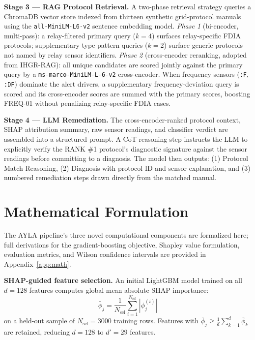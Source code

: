 \documentclass[twocolumn, 10pt, letterpaper]{article}
\begin{document}
\medskip
\noindent
\textbf{Stage 3 --- RAG Protocol Retrieval.}
A two-phase retrieval strategy queries a ChromaDB vector store indexed from
thirteen synthetic grid-protocol manuals using the \texttt{all-MiniLM-L6-v2}
sentence embedding model.
\textit{Phase 1} (bi-encoder, multi-pass): a relay-filtered primary query ($k{=}4$)
surfaces relay-specific FDIA protocols; supplementary type-pattern queries ($k{=}2$)
surface generic protocols not named by relay sensor identifiers.
\textit{Phase 2} (cross-encoder reranking, adopted from IHGR-RAG): all unique
candidates are scored jointly against the primary query by a
\texttt{ms-marco-MiniLM-L-6-v2} cross-encoder.
When frequency sensors (\texttt{:F}, \texttt{:DF}) dominate the alert drivers,
a supplementary frequency-deviation query is scored and its cross-encoder scores
are summed with the primary scores, boosting FREQ-01 without penalizing
relay-specific FDIA cases.

\medskip
\noindent
\textbf{Stage 4 --- LLM Remediation.}
The cross-encoder-ranked protocol context, SHAP attribution summary, raw sensor
readings, and classifier verdict are assembled into a structured prompt.
A CoT reasoning step instructs the LLM to explicitly verify the RANK \#1 protocol's
diagnostic signature against the sensor readings before committing to a diagnosis.
The model then outputs: (1) Protocol Match Reasoning,
(2) Diagnosis with protocol ID and sensor explanation, and (3) numbered remediation
steps drawn directly from the matched manual.

\section{Mathematical Formulation}
\label{sec:math}

The AYLA pipeline's three novel computational components are formalized here;
full derivations for the gradient-boosting objective, Shapley value formulation,
evaluation metrics, and Wilson confidence intervals are provided in
Appendix~\ref{app:math}.

\textbf{SHAP-guided feature selection.}
An initial LightGBM model trained on all $d{=}128$ features computes global mean
absolute SHAP importance:
\begin{equation}
    \bar{\phi}_j = \frac{1}{N_{\text{sel}}} \sum_{i=1}^{N_{\text{sel}}} |\phi_j^{(i)}|
\end{equation}
on a held-out sample of $N_{\text{sel}} = 3000$ training rows.
Features with $\bar{\phi}_j \geq \frac{1}{d}\sum_{k=1}^{d}\bar{\phi}_k$ are retained,
reducing $d{=}128$ to $d'{=}29$ features.
\end{document}
